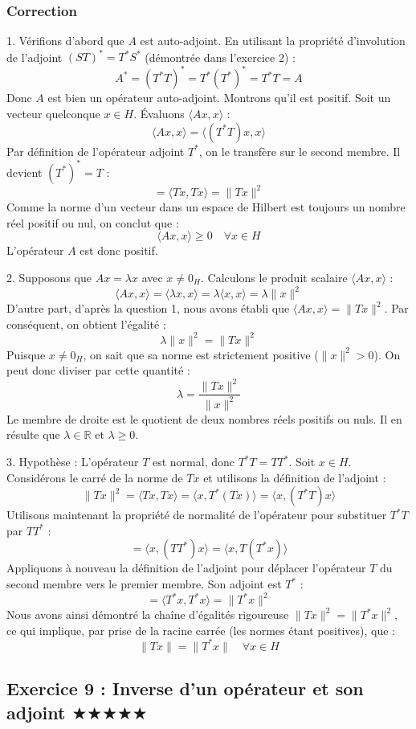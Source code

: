 \documentclass[11pt,a4paper]{article}
\begin{document}
\subsubsection*{Correction}
1. Vérifions d'abord que $A$ est auto-adjoint.
En utilisant la propriété d'involution de l'adjoint $(ST)^* = T^*S^*$ (démontrée dans l'exercice 2) :
$$ A^* = (T^* T)^* = T^* (T^*)^* = T^* T = A $$
Donc $A$ est bien un opérateur auto-adjoint.
Montrons qu'il est positif. Soit un vecteur quelconque $x \in H$. Évaluons $\langle Ax, x \rangle$ :
$$ \langle Ax, x \rangle = \langle (T^*T)x, x \rangle $$
Par définition de l'opérateur adjoint $T^*$, on le transfère sur le second membre. Il devient $(T^*)^* = T$ :
$$ = \langle Tx, Tx \rangle = \|Tx\|^2 $$
Comme la norme d'un vecteur dans un espace de Hilbert est toujours un nombre réel positif ou nul, on conclut que :
$$ \langle Ax, x \rangle \ge 0 \quad \forall x \in H $$
L'opérateur $A$ est donc positif.

2. Supposons que $Ax = \lambda x$ avec $x \ne 0_H$.
Calculons le produit scalaire $\langle Ax, x \rangle$ :
$$ \langle Ax, x \rangle = \langle \lambda x, x \rangle = \lambda \langle x, x \rangle = \lambda \|x\|^2 $$
D'autre part, d'après la question 1, nous avons établi que $\langle Ax, x \rangle = \|Tx\|^2$.
Par conséquent, on obtient l'égalité :
$$ \lambda \|x\|^2 = \|Tx\|^2 $$
Puisque $x \ne 0_H$, on sait que sa norme est strictement positive ($\|x\|^2 > 0$). On peut donc diviser par cette quantité :
$$ \lambda = \frac{\|Tx\|^2}{\|x\|^2} $$
Le membre de droite est le quotient de deux nombres réels positifs ou nuls. Il en résulte que $\lambda \in \mathbb{R}$ et $\lambda \ge 0$.

3. Hypothèse : L'opérateur $T$ est normal, donc $T^*T = TT^*$.
Soit $x \in H$. Considérons le carré de la norme de $Tx$ et utilisons la définition de l'adjoint :
$$ \|Tx\|^2 = \langle Tx, Tx \rangle = \langle x, T^*(Tx) \rangle = \langle x, (T^*T)x \rangle $$
Utilisons maintenant la propriété de normalité de l'opérateur pour substituer $T^*T$ par $TT^*$ :
$$ = \langle x, (TT^*)x \rangle = \langle x, T(T^*x) \rangle $$
Appliquons à nouveau la définition de l'adjoint pour déplacer l'opérateur $T$ du second membre vers le premier membre. Son adjoint est $T^*$ :
$$ = \langle T^*x, T^*x \rangle = \|T^*x\|^2 $$
Nous avons ainsi démontré la chaîne d'égalités rigoureuse $\|Tx\|^2 = \|T^*x\|^2$, ce qui implique, par prise de la racine carrée (les normes étant positives), que :
$$ \|Tx\| = \|T^*x\| \quad \forall x \in H $$


\subsection*{Exercice 9 : Inverse d'un opérateur et son adjoint $\bigstar\bigstar\bigstar\bigstar\bigstar$}
\end{document}
